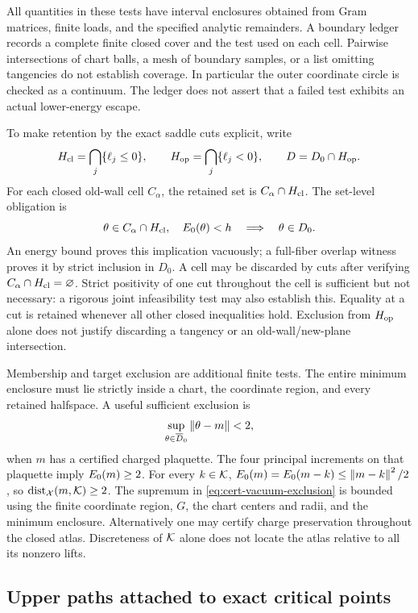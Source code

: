 All quantities in these tests have interval enclosures obtained from
Gram matrices, finite loads, and the specified analytic remainders.
A boundary ledger records a complete finite closed cover and the test
used on each cell. Pairwise intersections of chart balls, a mesh of
boundary samples, or a list omitting tangencies do not establish
coverage. In particular the outer coordinate circle is checked as a
continuum. The ledger does not assert that a failed test exhibits an
actual lower-energy escape.

To make retention by the exact saddle cuts explicit, write
\[
 H_{\rm cl}=\bigcap_j\{\ell_j\le0\},\qquad
 H_{\rm op}=\bigcap_j\{\ell_j<0\},\qquad D=D_0\cap H_{\rm op}.
\]
For each closed old-wall cell $C_\alpha$, the retained set is
$C_\alpha\cap H_{\rm cl}$. The set-level obligation is
\[
 \theta\in C_\alpha\cap H_{\rm cl},\quad E_0(\theta)<h
       \quad\Longrightarrow\quad\theta\in D_0.
\]
An energy bound proves this implication vacuously; a full-fiber overlap
witness proves it by strict inclusion in $D_0$. A cell may be discarded
by cuts after verifying $C_\alpha\cap H_{\rm cl}=\varnothing$.
Strict positivity of one cut throughout the cell is sufficient but not
necessary: a rigorous joint infeasibility test may also establish this.
Equality at a cut is retained whenever all other closed inequalities
hold. Exclusion from $H_{\rm op}$ alone does not justify discarding a
tangency or an old-wall/new-plane intersection.

Membership and target exclusion are additional finite tests. The entire
minimum enclosure must lie strictly inside a chart, the coordinate
region, and every retained halfspace. A useful sufficient exclusion is
\begin{equation}\label{eq:cert-vacuum-exclusion}
 \sup_{\theta\in\overline D_0}\left\lVert\theta-m\right\rVert<2,
\end{equation}
when $m$ has a certified charged plaquette. The four principal increments
on that plaquette imply $E_0(m)\ge2$. For every $k\in\mathcal K$,
$E_0(m)=E_0(m-k)\le\left\lVert m-k\right\rVert^2/2$, so
$\operatorname{dist}_\mathcal X(m,\mathcal K)\ge2$.
The supremum in \eqref{eq:cert-vacuum-exclusion} is bounded using the
finite coordinate region, $G$, the chart centers and radii, and the
minimum enclosure. Alternatively one may certify charge preservation
throughout the closed atlas. Discreteness of $\mathcal K$ alone does not locate
the atlas relative to all its nonzero lifts.

\subsection{Upper paths attached to exact critical points}

